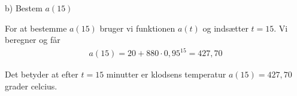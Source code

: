 b) Bestem $a(15)$

\ans
For at bestemme $a(15)$ bruger vi funktionen $a(t)$ og indsætter $t=15$. 
Vi beregner og får
\begin{align*}
    a(15) = 20 + 880\cdot 0,95^{15} = 427,70 
\end{align*}

Det betyder at efter $t = 15$ minutter er klodsens temperatur $a(15) = 427,70$ grader celcius. 

